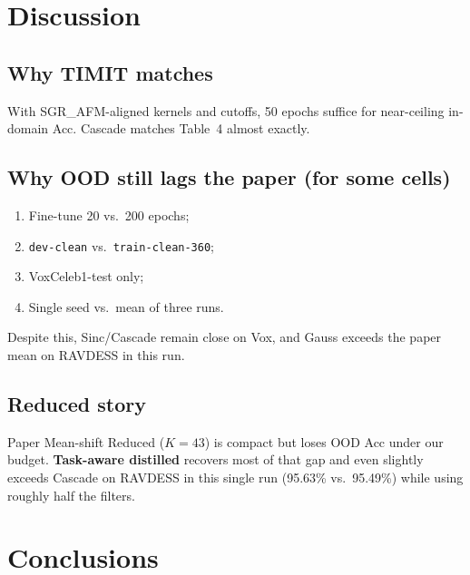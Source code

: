\documentclass[11pt,a4paper]{article}
\begin{document}
\section{Discussion}
\label{sec:discussion}

\subsection{Why TIMIT matches}

With SGR\_AFM-aligned kernels and cutoffs, 50 epochs suffice for near-ceiling in-domain Acc. Cascade matches Table~4 almost exactly.

\subsection{Why OOD still lags the paper (for some cells)}

\begin{enumerate}[leftmargin=1.6em,itemsep=0.25em]
  \item Fine-tune 20 vs.\ 200 epochs;
  \item \texttt{dev-clean} vs.\ \texttt{train-clean-360};
  \item VoxCeleb1-test only;
  \item Single seed vs.\ mean of three runs.
\end{enumerate}
Despite this, Sinc/Cascade remain close on Vox, and Gauss exceeds the paper mean on RAVDESS in this run.

\subsection{Reduced story}

Paper Mean-shift Reduced ($K{=}43$) is compact but loses OOD Acc under our budget. \textbf{Task-aware distilled} recovers most of that gap and even slightly exceeds Cascade on RAVDESS in this single run (95.63\% vs.\ 95.49\%) while using roughly half the filters.

\section{Conclusions}
\end{document}
